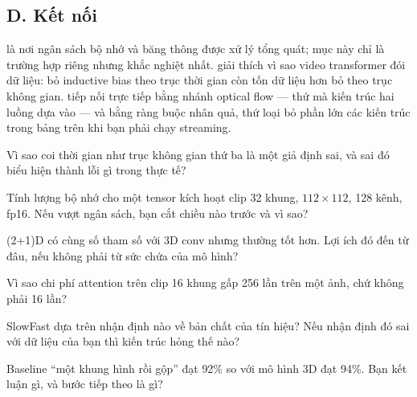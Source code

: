 \documentclass[../../../deep_learning.tex]{subfiles}
\begin{document}
\subsection{D. Kết nối}
 là nơi ngân sách bộ nhớ và băng thông được xử lý tổng quát; mục này chỉ là trường hợp riêng nhưng khắc nghiệt nhất.  giải thích vì sao video transformer đói dữ liệu: bỏ inductive bias theo trục thời gian còn tốn dữ liệu hơn bỏ theo trục không gian.  tiếp nối trực tiếp bằng nhánh optical flow --- thứ mà kiến trúc hai luồng dựa vào --- và bằng ràng buộc nhân quả, thứ loại bỏ phần lớn các kiến trúc trong bảng trên khi bạn phải chạy streaming.

\begin{tukiem}
\item Vì sao coi thời gian như trục không gian thứ ba là một giả định sai, và sai đó biểu hiện thành lỗi gì trong thực tế?
\item Tính lượng bộ nhớ cho một tensor kích hoạt clip 32 khung, \(112\times112\), 128 kênh, fp16. Nếu vượt ngân sách, bạn cắt chiều nào trước và vì sao?
\item (2+1)D có cùng số tham số với 3D conv nhưng thường tốt hơn. Lợi ích đó đến từ đâu, nếu không phải từ sức chứa của mô hình?
\item Vì sao chi phí attention trên clip 16 khung gấp 256 lần trên một ảnh, chứ không phải 16 lần?
\item SlowFast dựa trên nhận định nào về bản chất của tín hiệu? Nếu nhận định đó sai với dữ liệu của bạn thì kiến trúc hỏng thế nào?
\item Baseline ``một khung hình rồi gộp'' đạt 92\% so với mô hình 3D đạt 94\%. Bạn kết luận gì, và bước tiếp theo là gì?
\end{tukiem}
\ifSubfilesClassLoaded{\printbibliography[title={Nguồn}]}{}
\end{document}
